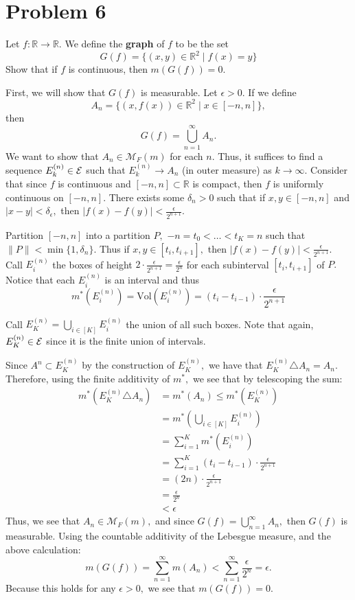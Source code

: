 \documentclass[11pt]{article}
\newcommand{\Vol}{\text{Vol}}
\newcommand{\bbR}{\mathbb{R}}
\begin{document}
\section*{Problem 6}
\begin{problem}
    Let $f: \bbR \to \bbR.$ We define the \textbf{graph} of $f$ to be the set 
    \[G(f)= \{(x,y) \in \bbR^2 \mid f(x) = y\}\] Show that if $f$ is continuous, then $m\left(G(f)\right) = 0.$
\end{problem}
\begin{solution}
    First, we will show that $G(f)$ is measurable. Let $\epsilon>0.$ If we define 
    \[A_n = \{(x, f(x))\in \bbR^2 \mid x \in [-n, n]\},\] then 
    \[G(f) = \bigcup_{n=1}^\infty A_n.\] We want to show that $A_n \in \mathcal{M}_F(m)$ for each $n.$ Thus, it suffices to find a sequence $E^{(n)}_k \in \cal E$ such that $E^{(n)}_k \to A_n$ (in outer measure) as $k\to \infty.$ 
    Consider that since $f$ is continuous and $[-n, n]\subset \bbR$ is compact, then $f$ is uniformly continuous on $[-n,n].$  There exists some $\delta_n >0$ such that if $x,y \in [-n, n]$ and $|x-y| < \delta_\epsilon,$ then $|f(x) - f(y)|< \frac{\epsilon}{2^{{n+1}}}.$ 
    
    
    Partition $[-n, n]$ into a partition $P,$ $-n = t_0< \dots< t_K = n$ such that $\|P\| < \min\{1, \delta_n\}.$ Thus if $x,y \in [t_i, t_{i+1}],$ then $|f(x) - f(y)|< \frac{\epsilon}{2^{n+1}}.$ Call $E^{(n)}_i$ the boxes of height $2 \cdot \frac{\epsilon}{2^{n+1}} = \frac{\epsilon}{2^n}$ for each subinterval $[t_i, t_{i+1}]$ of $P.$ Notice that each $E_{i}^{(n)}$ is an interval and thus 
    \[m^*(E_{i}^{(n)}) = \Vol(E_{i}^{(n)}) = (t_{i} - t_{i-1}) \cdot \frac{\epsilon}{2^{n+1}}\]
    
    Call $E^{(n)}_K = \bigcup_{i \in [K]} E_i^{(n)}$ the union of all such boxes. Note that again, $E^{(n)}_K \in \cal E$ since it is the finite union of intervals.
    
    Since $A^n \subset E_K^{(n)}$ by the construction of $E_K^{(n)},$ we have that $E_K^{(n)} \triangle A_n = A_n.$ Therefore, using the finite additivity of $m^*,$ we see that by telescoping the sum:
    \begin{align*}
      m^*(E_K^{(n)} \triangle A_n) &= m^*(A_n) \leq m^*(E_K^{(n)})\\ 
      &= m^*\left(\bigcup_{i\in [K]} E_i^{(n)}\right)\\
      &= \sum_{i =1}^{K}m^*(E_i^{(n)})\\
      &= \sum_{i=1}^K (t_{i} - t_{i-1}) \cdot \frac{\epsilon}{2^{n+1}}\\ 
      &= (2n)\cdot \frac{\epsilon}{2^{n+1}}\\
      &= \frac{\epsilon}{2^n}\\
      &< \epsilon
    \end{align*}
    Thus, we see that $A_n \in \mathcal{M}_F(m),$ and since $G(f) = \bigcup_{n=1}^\infty A_n,$ then $G(f)$ is measurable. Using the countable additivity of the Lebesgue measure, and the above calculation:
    \[m(G(f)) = \sum_{n=1}^\infty m(A_n) < \sum_{n=1}^\infty \frac{\epsilon}{2^n} = \epsilon.\] Because this holds for any $\epsilon>0,$ we see that $m(G(f)) = 0.$
\end{solution}
\end{document}
